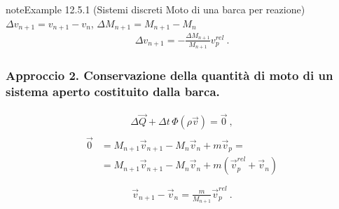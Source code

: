 \documentclass[letterpaper,10pt,italian]{jupyterBook}
\begin{document}
\begin{sphinxadmonition}{note}{Example 12.5.1 (Sistemi discreti \sphinxhyphen{} Moto di una barca per reazione)}
\sphinxAtStartPar
\(\Delta v_{n+1} = v_{n+1} - v_n\), \(\Delta M_{n+1} = M_{n+1} - M_{n}\)
\begin{equation*}
\begin{split}\Delta v_{n+1} = - \frac{\Delta M_{n+1}}{M_{n+1}} v_p^{rel} \ .\end{split}
\end{equation*}\subsubsection*{Approccio 2. Conservazione della quantità di moto di un sistema aperto costituito dalla barca.}
\begin{equation*}
\begin{split}\Delta \vec{Q} + \Delta t \, \Phi(\rho \vec{v}) = \vec{0} \ ,\end{split}
\end{equation*}\begin{equation*}
\begin{split}\begin{aligned}
  \vec{0} & = M_{n+1} \vec{v}_{n+1} - M_{n} \vec{v}_n + m \vec{v}_p =  \\
          & = M_{n+1} \vec{v}_{n+1} - M_{n} \vec{v}_n + m ( \vec{v}_p^{rel} + \vec{v}_n )  \\
\end{aligned}\end{split}
\end{equation*}\begin{equation*}
\begin{split}\vec{v}_{n+1} - \vec{v}_n = \frac{m}{M_{n+1}} \vec{v}_p^{rel} \ .\end{split}
\end{equation*}\end{sphinxadmonition}
\label{ch/mechanics/dynamics-eom-open:mechanics:dynamics:open:ex:carousel}
\end{document}
